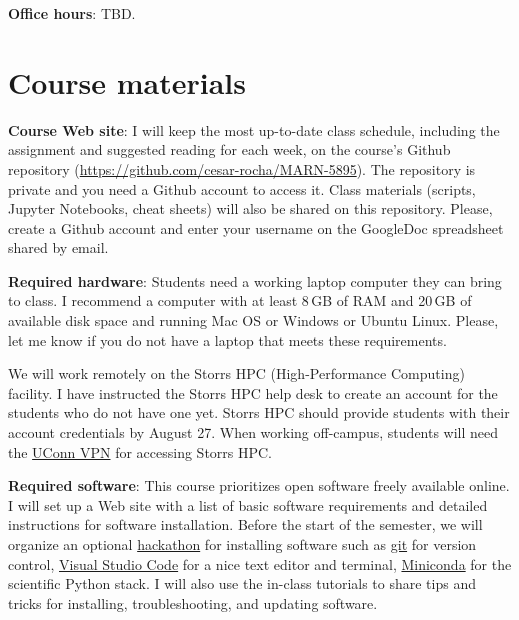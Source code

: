 \documentclass[11pt]{article}
\begin{document}
\textbf{Office hours}: TBD.


\section*{Course materials}

\textbf{Course Web site}: I will keep the most up-to-date class schedule, including the assignment and suggested reading for each week, on the course's Github repository (\href{https://github.com/cesar-rocha/MARN-5895}{https://github.com/cesar-rocha/MARN-5895}). The repository is private and you need a Github account to access it. Class materials (scripts, Jupyter Notebooks, cheat sheets) will also be shared on this repository. Please, create a Github account and enter your username on the GoogleDoc spreadsheet shared by email.

\textbf{Required hardware}: Students need a working laptop computer they can bring to class. I recommend a computer with at least 8\,GB of RAM and 20\,GB of available disk space and running Mac OS or Windows or Ubuntu Linux.  Please, let me know if you do not have a laptop that meets these requirements. 

We will work remotely on the Storrs HPC (High-Performance Computing) facility. I have instructed the Storrs HPC help desk to create an account for the students who do not have one yet. Storrs HPC should provide students with their account credentials by August 27.  When working off-campus, students will need the \href{https://confluence.uconn.edu/ikb/remote-access/virtual-private-network-vpn/accessing-the-uconn-network-through-a-vpn-client}{UConn VPN} for accessing Storrs HPC.




\textbf{Required software}:  This course prioritizes open software freely
available online. I will set up a Web site with a list of basic software
requirements and detailed instructions for software installation. Before the
start of the semester, we will organize an optional
\href{https://hackathon.guide}{hackathon} for installing software such as
\href{https://git-scm.com/book/en/v2/Getting-Started-Installing-Git}{git} for
version control, \href{https://code.visualstudio.com/}{Visual Studio Code} for
a nice text editor and terminal, \href{https://docs.conda.io/en/latest/miniconda.html}{Miniconda} for the scientific Python stack. I will also use the in-class tutorials to share tips and tricks for installing, troubleshooting, and updating software.
\end{document}
